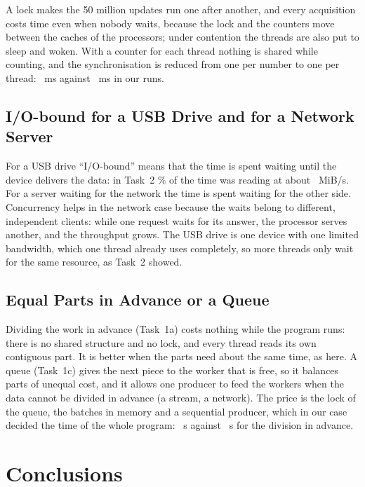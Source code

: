 \documentclass[12pt,a4paper]{article}
\begin{document}
A lock makes the 50 million updates run one after another, and every acquisition costs time even when nobody waits, because the lock and the counters move between the caches of the processors; under contention the threads are also put to sleep and woken. With a counter for each thread nothing is shared while counting, and the synchronisation is reduced from one per number to one per thread: \bPerThreadMs{}~ms against \bLockMs{}~ms in our runs.

\subsection{I/O-bound for a USB Drive and for a Network Server}

For a USB drive ``I/O-bound'' means that the time is spent waiting until the device delivers the data: in Task~2 \tUsbReadShare\% of the time was reading at about \tUsbMiBs{}~MiB/s. For a server waiting for the network the time is spent waiting for the other side. Concurrency helps in the network case because the waits belong to different, independent clients: while one request waits for its answer, the processor serves another, and the throughput grows. The USB drive is one device with one limited bandwidth, which one thread already uses completely, so more threads only wait for the same resource, as Task~2 showed.

\subsection{Equal Parts in Advance or a Queue}
\label{cq:queue}

Dividing the work in advance (Task~1a) costs nothing while the program runs: there is no shared structure and no lock, and every thread reads its own contiguous part. It is better when the parts need about the same time, as here. A queue (Task~1c) gives the next piece to the worker that is free, so it balances parts of unequal cost, and it allows one producer to feed the workers when the data cannot be divided in advance (a stream, a network). The price is the lock of the queue, the batches in memory and a sequential producer, which in our case decided the time of the whole program: \cSecBest{}~s against \aSecBest{}~s for the division in advance.

\newpage
\section{Conclusions}
\end{document}

